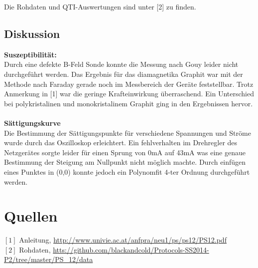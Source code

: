 \documentclass[12pt,a4paper]{article}
\begin{document}
\begin{multicols}{2}

\noindent
Die Rohdaten und QTI-Auswertungen sind unter [2] zu finden.

\subsection{Diskussion}
\textbf{Suszeptibilität:}\\
Durch eine defekte B-Feld Sonde konnte die Messung nach Gouy leider nicht durchgeführt werden. Das Ergebnis für das diamagnetika Graphit war mit der Methode nach Faraday gerade noch im Messbereich der Geräte feststellbar. Trotz Anmerkung in [1] war die geringe Krafteinwirkung überraschend. Ein Unterschied bei polykristalinen und monokristalinem Graphit ging in den Ergebnissen hervor.\\
\\
\textbf{Sättigungskurve}\\
Die Bestimmung der Sättigungspunkte für verschiedene Spannungen und Ströme wurde durch das Oszilloskop erleichtert. Ein fehlverhalten im Drehregler des Netzgerätes sorgte leider für einen Sprung von 0mA auf 43mA was eine genaue Bestimmung der Steigung am Nullpunkt nicht möglich machte. Durch einfügen eines Punktes in (0,0) konnte jedoch ein Polynomfit 4-ter Ordnung durchgeführt werden. %


\section{Quellen}
$[1]$ Anleitung, \url{http://www.univie.ac.at/anfpra/neu1/ps/ps12/PS12.pdf}\\
$[2]$ Rohdaten, \url{htts://github.com/blackandcold/Protocols-SS2014-P2/tree/master/PS_12/data}\\

\end{multicols}
\end{document}
